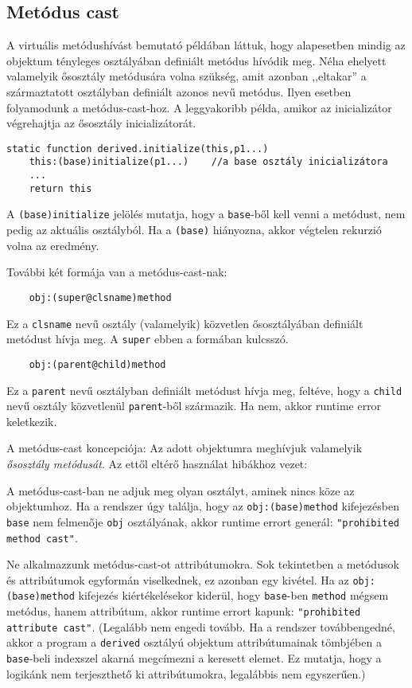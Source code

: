 \subsection{Metódus cast}

A virtuális metódushívást bemutató példában láttuk, 
hogy alapesetben mindig az objektum tényleges osztályában definiált metódus
hívódik meg. Néha ehelyett valamelyik ősosztály metódusára volna szükség,
amit azonban ,,eltakar'' a származtatott osztályban definiált azonos nevű
metódus. Ilyen esetben folyamodunk a metódus-cast-hoz.
A leggyakoribb példa, amikor az inicializátor végrehajtja
az ősosztály inicializátorát.
\begin{verbatim}
static function derived.initialize(this,p1...)
    this:(base)initialize(p1...)    //a base osztály inicializátora
    ...
    return this
\end{verbatim}
A \verb!(base)initialize! jelölés mutatja, hogy a \verb!base!-ből
kell venni a metódust, nem pedig az aktuális osztályból. 
Ha a \verb!(base)! hiányozna, akkor végtelen rekurzió volna az eredmény.

További két formája van a metódus-cast-nak:
\begin{verbatim}
    obj:(super@clsname)method
\end{verbatim}
Ez a \verb!clsname! nevű osztály (valamelyik) közvetlen ősosztályában
definiált metódust hívja meg. A \verb!super! ebben a formában kulcsszó.

\begin{verbatim}
    obj:(parent@child)method
\end{verbatim}
Ez a \verb!parent! nevű osztályban definiált metódust hívja meg,
feltéve, hogy a \verb!child! nevű osztály közvetlenül \verb!parent!-ből
származik. Ha nem, akkor runtime error keletkezik.


A metódus-cast koncepciója: Az adott objektumra meghívjuk valamelyik 
{\em ősosztály metódusát}. Az ettől eltérő használat hibákhoz vezet:

 A metódus-cast-ban ne adjuk meg olyan osztályt, 
 aminek nincs köze az objektumhoz. Ha a rendszer úgy találja, hogy
 az \verb!obj:(base)method! kifejezésben \verb!base! nem felmenője
 \verb!obj! osztályának, akkor runtime errort generál: 
 \verb!"prohibited method cast"!.

 Ne alkalmazzunk metódus-cast-ot attribútumokra. 
 Sok tekintetben a metódusok és attribútumok
 egyformán viselkednek, ez azonban egy kivétel.
 Ha az \verb!obj:(base)method! kifejezés kiértékelésekor kiderül, 
 hogy \verb!base!-ben \verb!method! mégsem metódus, hanem attribútum, 
 akkor runtime errort kapunk: \verb!"prohibited attribute cast"!.
 (Legalább nem engedi tovább. Ha a rendszer továbbengedné, akkor 
 a program a \verb!derived!  osztályú objektum attribútumainak tömbjében 
 a \verb!base!-beli indexszel akarná megcímezni a keresett elemet.
 Ez mutatja, hogy a logikánk nem terjeszthető ki attribútumokra,
 legalábbis nem egyszerűen.)







